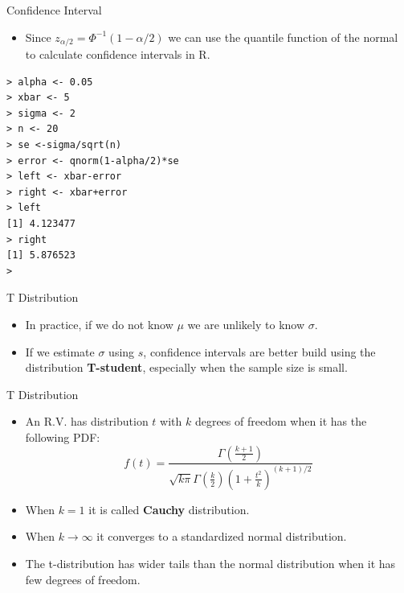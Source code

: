 \documentclass[handout]{beamer}
\begin{document}
\begin{frame}[fragile]{Confidence Interval}

\scriptsize{
\begin{itemize}
 \item Since $z_{\alpha/2} = \Phi^{-1}(1-\alpha/2)$ we can use the quantile function of the normal to calculate confidence intervals in R.
\end{itemize}


\begin{verbatim}
> alpha <- 0.05
> xbar <- 5
> sigma <- 2
> n <- 20
> se <-sigma/sqrt(n)
> error <- qnorm(1-alpha/2)*se
> left <- xbar-error
> right <- xbar+error
> left
[1] 4.123477
> right
[1] 5.876523
>
\end{verbatim}
}



\end{frame}

\begin{frame}{T Distribution}
\scriptsize{
\begin{itemize}
 \item In practice, if we do not know $\mu$ we are unlikely to know $\sigma$.
 \item If we estimate $\sigma$ using $s$, confidence intervals are better build using the distribution \textbf{T-student}, especially when the sample size is small.
\end{itemize}

\begin{block}{T Distribution}
\begin{itemize}
 \item An R.V. has distribution $t$ with $k$ degrees of freedom when it has the following PDF:
\begin{displaymath}
 f(t)=\frac{\Gamma(\frac{k+1}{2})}{\sqrt{k\pi}\Gamma(\frac k2)(1+\frac{t^2}{k})^{(k+1)/2}}
\end{displaymath}
\item  When $k=1$ it is called \textbf{Cauchy} distribution.
\item When $k\rightarrow \infty$ it converges to a standardized normal distribution.
 \item The t-distribution has wider tails than the normal distribution when it has few degrees of freedom.


\end{itemize}

 
\end{block}




} 
\end{frame}
\end{document}
